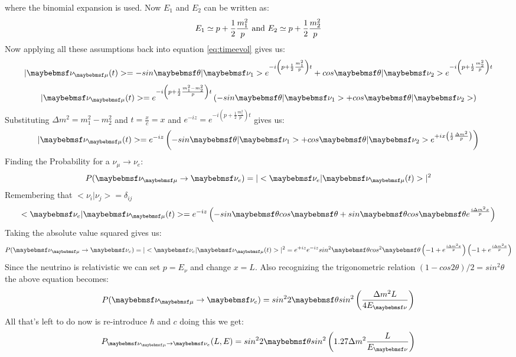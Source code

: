 where the binomial expansion is used. Now $E_{1}$ and $E_{2}$ can be written as:
\begin{equation}
\centering
E_{1} \simeq p + \frac{1}{2}\frac{m^2_{1}}{p} \mbox{    and    }  E_{2} \simeq p + \frac{1}{2}\frac{m^2_{2}}{p}
\end{equation} 
Now applying all these assumptions back into equation \ref{eq:timeevol} gives us:
\begin{equation}
\centering
|\nu_{\mu}(t)> = -sin\theta|\nu_{1}>e^{-i\left( p+\frac{1}{2}\frac{m^2_{1}}{p}\right)t} + cos\theta|\nu_{2}>e^{-i\left(p+\frac{1}{2}\frac{m^2_{2}}{p}\right)t}
\end{equation}
\begin{equation}
\centering
|\nu_{\mu}(t)> = e^{-i \left( p+\frac{1}{2}\frac{m^2_{1}-m^2_{2}}{p} \right) t} \left( -sin\theta|\nu_{1}> + cos\theta|\nu_{2}> \right)
\end{equation}
Substituting $\Delta m^2 = m^2_{1}-m^2_{2}$ and $t = \frac{x}{c} =x$ and $e^{-iz}= e^{-i \left( p+\frac{1}{2}\frac{m^2_{1}}{p} \right) t}$ gives us:
 \begin{equation}
 \centering
 |\nu_{\mu}(t)> = e^{-iz} \left( -sin\theta|\nu_{1}> + cos\theta|\nu_{2}>e^{+ix \left(\frac{1}{2}\frac{\Delta m^2}{p}\right)}\right)
 \end{equation}
Finding the Probability for a $\nu_{\mu} \rightarrow \nu_{e}$:
\begin{equation}
\centering
P(\nu_{\mu} \rightarrow \nu_{e}) = |<\nu_{e}|\nu_{\mu}(t)>|^2
\end{equation}
Remembering that $<\nu_{i}|\nu_{j}>=\delta_{ij}$
\begin{equation}
\centering
<\nu_{e}|\nu_{\mu}(t)> = e^{-iz}\left(-sin\theta cos\theta + sin\theta cos\theta e^{\frac{i \Delta m^2 x}{p}}\right)
\end{equation}
Taking the absolute value squared gives us:
\begin{equation}
\centering
P(\nu_{\mu} \rightarrow \nu_{e}) = |<\nu_{e}|\nu_{\mu}(t)>|^2 = e^{+iz}e^{-iz}sin^{2}\theta cos^{2}\theta\left( -1 + e^{\frac{i \Delta m^2 x}{p}}\right)\left(-1 + e^{\frac{i \Delta m^2 x}{p}}\right)
\end{equation}
Since the neutrino is relativistic we can set $p= E_{\nu}$ and change $x=L$. Also recognizing the trigonometric relation $(1 - cos2\theta)/2 = sin^{2}\theta$ the above equation becomes:
\begin{equation}
\centering
P(\nu_{\mu} \rightarrow \nu_{e}) = sin^{2}2\theta sin^2\left(\frac{\Delta m^2 L}{4 E_{\nu}}\right)
\end{equation}
All that's left to do now is re-introduce $\hbar$ and $c$ doing this we get:
 \begin{equation}
 \centering
 P_{\nu_{\mu} \rightarrow \nu_{e}} (L,E) = sin^{2}2\theta sin^2\left(1.27 \Delta m^2 \frac{L}{E_{\nu}}\right)
 \end{equation}
 
